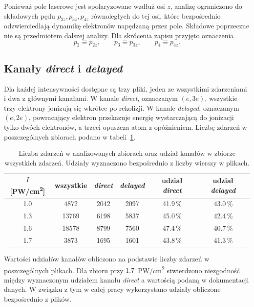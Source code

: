 \documentclass[12pt,a4paper]{article}
\newcommand{\PWcm}{PW/cm\textsuperscript{2}}
\begin{document}
Ponieważ pole laserowe jest spolaryzowane wzdłuż osi \(z\), analizę ograniczono do składowych pędu $p_{2z},p_{3z},p_{4z}$ równoległych do tej osi, które bezpośrednio odzwierciedlają dynamikę elektronów napędzaną przez pole. Składowe poprzeczne nie są przedmiotem dalszej analizy. Dla skrócenia zapisu
przyjęto oznaczenia
\begin{equation}
p_2 \equiv p_{2z},\qquad p_3 \equiv p_{3z},\qquad p_4 \equiv p_{4z}.
\end{equation}

\subsection{Kanały \emph{direct} i \emph{delayed}}

Dla każdej intensywności dostępne są trzy pliki, jeden ze wszystkimi zdarzeniami i dwa z głównymi kanałami. W kanale \emph{direct}, oznaczanym
$(e,3e)$, wszystkie trzy elektrony jonizują się wkrótce po
rekolizji. W kanale \emph{delayed}, oznaczanym $(e,2e)$, powracający
elektron przekazuje energię wystarczającą do jonizacji tylko dwóch
elektronów, a trzeci opuszcza atom z opóźnieniem. Liczbę zdarzeń w poszczególnych zbiorach podano w tabeli~\ref{tab:licznosci}.

\begin{table}[H]
\centering
\caption{Liczba zdarzeń w analizowanych zbiorach oraz udział kanałów w
zbiorze wszystkich zdarzeń. Udziały wyznaczono bezpośrednio z liczby
wierszy w plikach.}
\label{tab:licznosci}
\begin{tabular}{cccccc}
\toprule
$I$ [\PWcm] & wszystkie & \emph{direct} & \emph{delayed} &
udział \emph{direct} & udział \emph{delayed} \\
\midrule
\num{1.0} & \num{4872}  & \num{2042} & \num{2097} & \num{41.9}\,\% & \num{43.0}\,\% \\
\num{1.3} & \num{13769} & \num{6198} & \num{5837} & \num{45.0}\,\% & \num{42.4}\,\% \\
\num{1.6} & \num{18578} & \num{8799} & \num{7560} & \num{47.4}\,\% & \num{40.7}\,\% \\
\num{1.7} & \num{3873}  & \num{1695} & \num{1601} & \num{43.8}\,\% & \num{41.3}\,\% \\
\bottomrule
\end{tabular}
\end{table}

Wartości udziałów kanałów obliczono na podstawie liczby zdarzeń w poszczególnych plikach. Dla zbioru przy \(\num{1.7}\)~\PWcm{} stwierdzono niezgodność między wyznaczonym udziałem kanału \emph{direct} a wartością podaną w dokumentacji danych. W związku z tym w całej pracy wykorzystano udziały obliczone bezpośrednio z plików.
\end{document}
